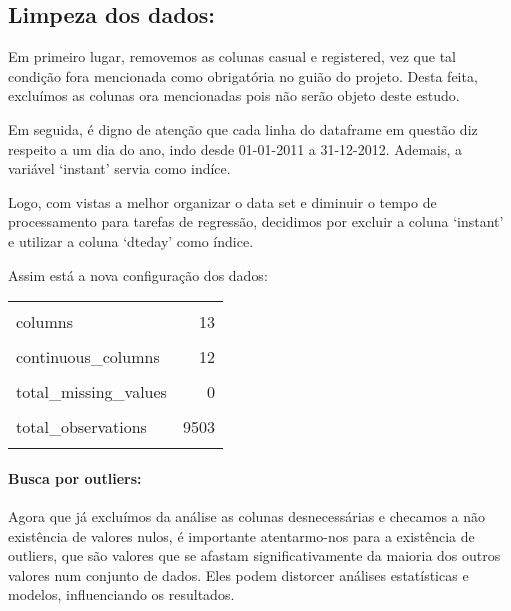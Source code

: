 \documentclass[
  letterpaper,
  DIV=11,
  numbers=noendperiod]{scrartcl}
\let\oldparagraph\paragraph
\renewcommand{\paragraph}[1]{\oldparagraph{#1}\mbox{}}
\begin{document}
\newpage{}

\subsection{Limpeza dos dados:}\label{limpeza-dos-dados}

Em primeiro lugar, removemos as colunas casual e registered, vez que tal
condição fora mencionada como obrigatória no guião do projeto. Desta
feita, excluímos as colunas ora mencionadas pois não serão objeto deste
estudo.

Em seguida, é digno de atenção que cada linha do dataframe em questão
diz respeito a um dia do ano, indo desde 01-01-2011 a 31-12-2012.
Ademais, a variável `instant' servia como indíce.

Logo, com vistas a melhor organizar o data set e diminuir o tempo de
processamento para tarefas de regressão, decidimos por excluir a coluna
`instant' e utilizar a coluna `dteday' como índice.

Assim está a nova configuração dos dados:

\begin{table}[!h]
\centering\begingroup\fontsize{10}{12}\selectfont

\begin{tabular}{lr}
\toprule
\cellcolor{gray!15}{rows} & \cellcolor{gray!15}{731}\\
columns & 13\\
\cellcolor{gray!15}{discrete\_columns} & \cellcolor{gray!15}{1}\\
continuous\_columns & 12\\
\cellcolor{gray!15}{all\_missing\_columns} & \cellcolor{gray!15}{0}\\
\addlinespace
total\_missing\_values & 0\\
\cellcolor{gray!15}{complete\_rows} & \cellcolor{gray!15}{731}\\
total\_observations & 9503\\
\cellcolor{gray!15}{memory\_usage} & \cellcolor{gray!15}{102928}\\
\bottomrule
\end{tabular}
\endgroup{}
\end{table}

\paragraph{Busca por outliers:}\label{busca-por-outliers}

Agora que já excluímos da análise as colunas desnecessárias e checamos a
não existência de valores nulos, é importante atentarmo-nos para a
existência de outliers, que são valores que se afastam
significativamente da maioria dos outros valores num conjunto de dados.
Eles podem distorcer análises estatísticas e modelos, influenciando os
resultados.
\end{document}
